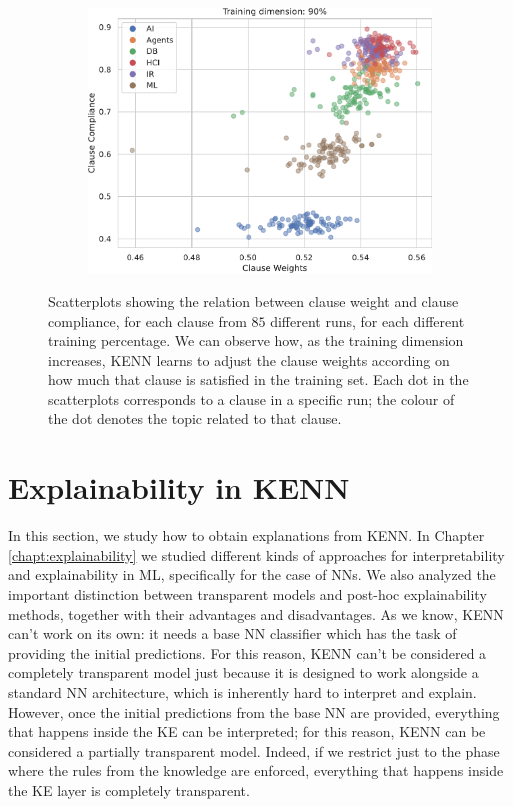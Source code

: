 \begin{figure}
\begin{subfigure}{0.5\textwidth}
	\includegraphics[width=0.95\linewidth]{figures/scatter_90.pdf}
	\label{fig:ee}	
\end{subfigure}
\caption{Scatterplots showing the relation between clause weight and clause compliance, for each clause from $85$ different runs, for each different training percentage. We can observe how, as the training dimension increases, KENN learns to adjust the clause weights according on how much that clause is satisfied in the training set. Each dot in the scatterplots corresponds to a clause in a specific run; the colour of the dot denotes the topic related to that clause.}
\label{fig:corrplots}
\end{figure}

 \section{Explainability in KENN}
 \label{sec:explainability_kenn}
 In this section, we study how to obtain explanations from KENN. In Chapter \ref{chapt:explainability} we studied different kinds of approaches for interpretability and explainability in ML, specifically for the case of NNs. We also analyzed the important distinction between transparent models and post-hoc explainability methods, together with their advantages and disadvantages.
 As we know, KENN can't work on its own: it needs a base NN classifier which has the task of providing the initial predictions. For this reason, KENN can't be considered a completely transparent model just because it is designed to work alongside a standard NN architecture, which is inherently hard to interpret and explain. However, once the initial predictions from the base NN are provided, everything that happens inside the KE can be interpreted; for this reason, KENN can be considered a partially transparent model. Indeed, if we restrict just to the phase where the rules from the knowledge are enforced, everything that happens inside the KE layer is completely transparent. 

